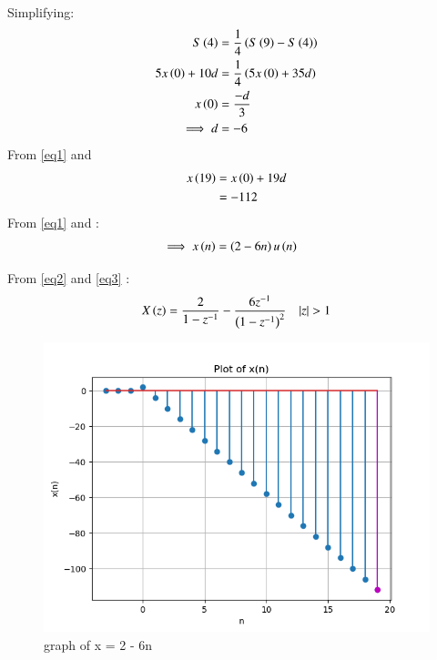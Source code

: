\documentclass[journal,12pt,twocolumn]{IEEEtran}
\theoremstyle{remark}
\begin{document}
Simplifying:
    \begin{align}
        S\left(4\right) &= \frac{1}{4}\left(S\left(9\right)-S\left(4\right)\right)\\
        5x\left(0\right) + 10d &= \frac{1}{4}\left(5x\left(0\right) + 35d\right)\\
        x\left(0\right) &= \frac{-d}{3}\\
        \implies d &= -6 \label{eq1}
    \end{align}
    From \eqref{eq1} and 
    \begin{align}
        x\left(19\right)&=x\left(0\right)+19d\\ 
        &= -112
    \end{align}
From \eqref{eq1} and :
    \begin{align}
        \implies x\left(n\right)&=\left(2-6n\right)u\left(n\right) \label{eq3}
    \end{align}
    
From \eqref{eq2} and \eqref{eq3} :
    \begin{align}
        X\brak{z}=\frac{2}{1-z^{-1}} - \frac{6z^{-1}}{\brak{1-z^{-1}}^{2}} \quad |z|>1
    \end{align}

    \begin{figure}[h]
    \renewcommand\thefigure{1}
        \centering
        \includegraphics[width=1\linewidth]{figs/Figure_1.png}
        \caption{graph of x = 2 - 6n}
    \end{figure}
\end{document}
